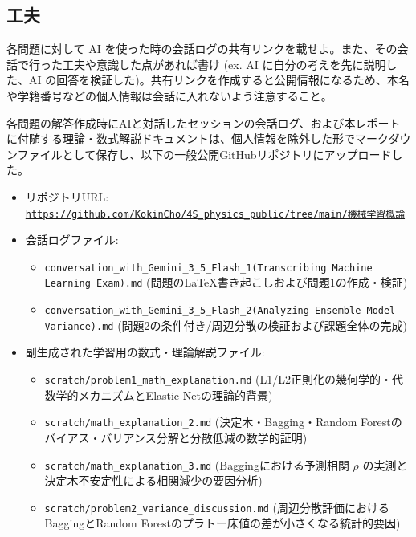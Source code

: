 \documentclass[11pt,a4paper,dvipdfmx]{article}
\numberwithin{equation}{section}
\newenvironment{note}[0]
{
    \begin{tcolorbox}[sharp corners, colframe=gray!20, colback=gray!20, width=\textwidth]
}
{
    \end{tcolorbox}
}
\begin{document}
\subsection*{工夫}
\begin{note}
各問題に対して AI を使った時の会話ログの共有リンクを載せよ。また、その会話で行った工夫や意識した点があれば書け (ex. AI に自分の考えを先に説明した、AI の回答を検証した)。共有リンクを作成すると公開情報になるため、本名や学籍番号などの個人情報は会話に入れないよう注意すること。
\end{note}
\begin{proofbox}
各問題の解答作成時にAIと対話したセッションの会話ログ、および本レポートに付随する理論・数式解説ドキュメントは、個人情報を除外した形でマークダウンファイルとして保存し、以下の一般公開GitHubリポジトリにアップロードした。
\begin{itemize}
    \item リポジトリURL: \href{https://github.com/KokinCho/4S_physics_public/tree/main/\%E6\%A9\%9F\%E6\%A2%B0\%E5%AD\%A6\%E7\%BF%92%E6%A6%82%E8%AB%96}{\texttt{https://github.com/KokinCho/4S\_physics\_public/tree/main/機械学習概論}}
    \item 会話ログファイル: 
    \begin{itemize}
        \item \texttt{conversation\_with\_Gemini\_3\_5\_Flash\_1(Transcribing Machine Learning Exam).md} (問題のLaTeX書き起こしおよび問題1の作成・検証)
        \item \texttt{conversation\_with\_Gemini\_3\_5\_Flash\_2(Analyzing Ensemble Model Variance).md} (問題2の条件付き/周辺分散の検証および課題全体の完成)
    \end{itemize}
    \item 副生成された学習用の数式・理論解説ファイル: 
    \begin{itemize}
        \item \texttt{scratch/problem1\_math\_explanation.md} (L1/L2正則化の幾何学的・代数学的メカニズムとElastic Netの理論的背景)
        \item \texttt{scratch/math\_explanation\_2.md} (決定木・Bagging・Random Forestのバイアス・バリアンス分解と分散低減の数学的証明)
        \item \texttt{scratch/math\_explanation\_3.md} (Baggingにおける予測相関 $\rho$ の実測と決定木不安定性による相関減少の要因分析)
        \item \texttt{scratch/problem2\_variance\_discussion.md} (周辺分散評価におけるBaggingとRandom Forestのプラトー床値の差が小さくなる統計的要因)

\end{itemize}
\end{itemize}
\end{proofbox}
\end{document}
